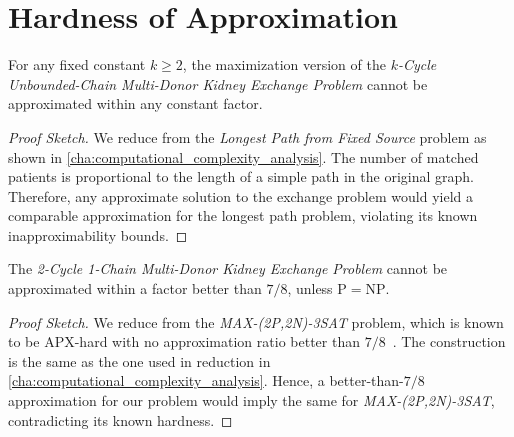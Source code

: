\section{Hardness of Approximation}


\begin{lemma}
For any fixed constant $k \ge 2$, the maximization version of the \textit{$k$-Cycle Unbounded-Chain Multi-Donor Kidney Exchange Problem} cannot be approximated within any constant factor.
\end{lemma}

\begin{proof}[Proof Sketch]
We reduce from the \textit{Longest Path from Fixed Source} problem as shown in \autoref{cha:computational_complexity_analysis}. The number of matched patients is proportional to the length of a simple path in the original graph. Therefore, any approximate solution to the exchange problem would yield a comparable approximation for the longest path problem, violating its known inapproximability bounds.
\end{proof}

\begin{lemma}
The \textit{2-Cycle 1-Chain Multi-Donor Kidney Exchange Problem} cannot be approximated within a factor better than $7/8$, unless $\mathrm{P} = \mathrm{NP}$.
\end{lemma}

\begin{proof}[Proof Sketch]
We reduce from the \textit{MAX-(2P,2N)-3SAT} problem, which is known to be APX-hard with no approximation ratio better than $7/8$~\cite{berman2003restricted}. The construction is the same as the one used in reduction in \autoref{cha:computational_complexity_analysis}. Hence, a better-than-$7/8$ approximation for our problem would imply the same for \textit{MAX-(2P,2N)-3SAT}, contradicting its known hardness.
\end{proof}




